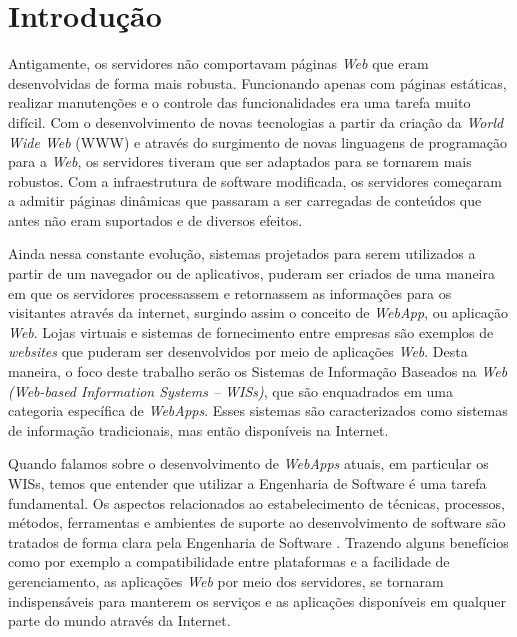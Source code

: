 
\section{Introdução}
\label{sec-intro}


Antigamente, os servidores não comportavam páginas \textit{Web} que eram desenvolvidas de forma mais robusta. Funcionando apenas com páginas estáticas, realizar manutenções e o controle das funcionalidades era uma tarefa muito difícil. Com o desenvolvimento de novas tecnologias a partir da criação da \textit{World Wide Web} (WWW) e através do surgimento de novas linguagens de programação para a \textit{Web}, os servidores tiveram que ser adaptados para se tornarem mais robustos. Com a infraestrutura de software modificada, os servidores começaram a admitir páginas dinâmicas que passaram a ser carregadas de conteúdos que antes não eram suportados e de diversos efeitos.

Ainda nessa constante evolução, sistemas projetados para serem utilizados a partir de um navegador ou de aplicativos, puderam ser criados de uma maneira em que os servidores processassem e retornassem as informações para os visitantes através da internet, surgindo assim o conceito de \textit{WebApp}, ou aplicação \textit{Web}. Lojas virtuais e sistemas de fornecimento entre empresas são exemplos de \textit{websites} que puderam ser desenvolvidos por meio de aplicações \textit{Web}. Desta maneira, o foco deste trabalho serão os Sistemas de Informação Baseados na \textit{Web (Web-based Information Systems – WISs)}, que são enquadrados em uma categoria específica de \textit{WebApps}. Esses sistemas são caracterizados como sistemas de informação tradicionais, mas então disponíveis na Internet.

Quando falamos sobre o desenvolvimento de \textit{WebApps} atuais, em particular os WISs, temos que entender que utilizar a Engenharia de Software é uma tarefa fundamental. Os aspectos relacionados ao estabelecimento de técnicas, processos, métodos, ferramentas e ambientes de suporte ao desenvolvimento de software são tratados de forma clara pela Engenharia de Software \cite{falbo:es14}. Trazendo alguns benefícios como por exemplo a compatibilidade entre plataformas e a facilidade de gerenciamento, as aplicações \textit{Web} por meio dos servidores, se tornaram indispensáveis para manterem os serviços e as aplicações disponíveis em qualquer parte do mundo através da Internet.

